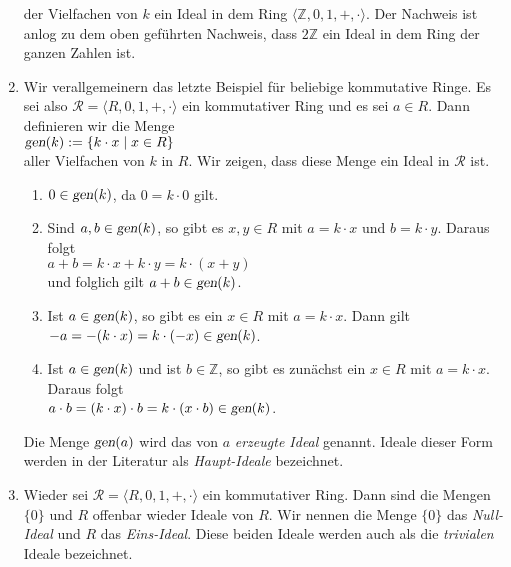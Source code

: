 \begin{enumerate}
      der Vielfachen von $k$  ein Ideal in dem Ring $\langle \mathbb{Z}, 0, 1, +, \cdot \rangle$.
      Der Nachweis ist anlog zu dem oben gef\"{u}hrten Nachweis, dass $2\mathbb{Z}$ ein Ideal
      in dem Ring der ganzen Zahlen ist.
\item Wir verallgemeinern das letzte Beispiel f\"{u}r beliebige kommutative Ringe.
      Es sei also $\mathcal{R} = \langle R, 0, 1, +, \cdot \rangle$ ein kommutativer Ring
      und es sei $a \in R$.  Dann definieren wir die Menge
      \\
      \hspace*{1.3cm}
      $\textsl{gen}(k) := \{ k \cdot x \mid x \in R \}$
      \\[0.2cm]
      aller Vielfachen von $k$ in $R$.  Wir zeigen, dass diese Menge ein Ideal in
      $\mathcal{R}$ ist.
      \begin{enumerate}
      \item $0 \in \textsl{gen}(k)$, da $0 = k \cdot 0$ gilt. 
      \item Sind $a, b \in \textsl{gen}(k)$, so gibt es $x,y \in R$ mit $a = k \cdot x$ und 
            $b = k \cdot y$.  Daraus folgt
            \\[0.2cm]
            \hspace*{1.3cm}
            $a + b = k \cdot x + k \cdot y = k \cdot (x + y)$
            \\[0.2cm]
            und folglich gilt $a+b \in \textsl{gen}(k)$.
      \item Ist $a \in \textsl{gen}(k)$, so gibt es ein $x \in R$ mit $a = k \cdot x$.  Dann gilt
            \\[0.2cm]
            \hspace*{1.3cm}
            $-a = - (k \cdot x) = k \cdot (-x) \in \textsl{gen}(k)$.
      \item Ist $a \in \textsl{gen}(k)$ und ist $b \in \mathbb{Z}$, so gibt es zun\"{a}chst ein
            $x \in R$ mit $a = k \cdot x$.  Daraus folgt
            \\[0.2cm]
            \hspace*{1.3cm}
            $a \cdot b = (k \cdot x) \cdot b = k \cdot (x \cdot b) \in \textsl{gen}(k)$.
      \end{enumerate}
      Die Menge $\textsl{gen}(a)$ wird das von $a$ {\color{blue}\emph{erzeugte Ideal}} genannt.
      Ideale dieser Form werden in der Literatur als {\color{blue}\emph{Haupt-Ideale}} bezeichnet.
\item Wieder sei $\mathcal{R} = \langle R, 0, 1, +, \cdot \rangle$ ein kommutativer Ring.  Dann
      sind die Mengen $\{0\}$ und $R$ offenbar wieder Ideale von $R$.  Wir nennen  die Menge $\{0\}$
      das {\color{blue}\emph{Null-Ideal}} und $R$ das {\color{blue}\emph{Eins-Ideal}}.  Diese
      beiden Ideale werden auch als die \emph{\color{blue}trivialen} Ideale bezeichnet.
      \eoxs
\end{enumerate}


